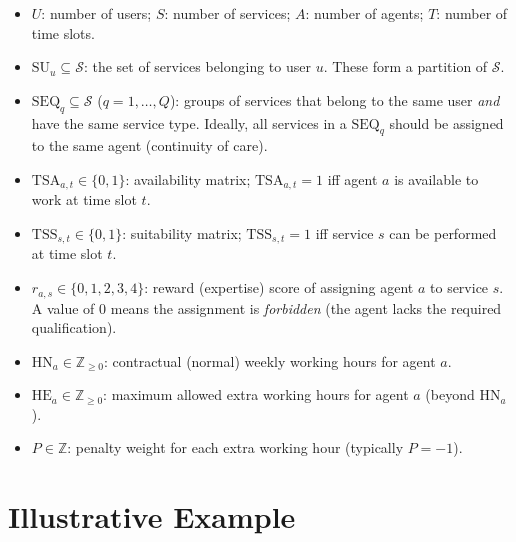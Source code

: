 \documentclass[11pt,a4paper]{article}
\newcommand{\setS}{\mathcal{S}}
\newcommand{\SU}{\mathrm{SU}}
\newcommand{\SEQ}{\mathrm{SEQ}}
\newcommand{\TSA}{\mathrm{TSA}}
\newcommand{\TSS}{\mathrm{TSS}}
\newcommand{\HN}{\mathrm{HN}}
\newcommand{\HE}{\mathrm{HE}}
\begin{document}
\begin{itemize}
    \item $U$: number of users; \;
          $S$: number of services; \;
          $A$: number of agents; \;
          $T$: number of time slots.
    \item $\SU_u \subseteq \setS$: the set of services belonging to user $u$.
          These form a partition of $\setS$.
    \item $\SEQ_q \subseteq \setS$ ($q = 1,\ldots,Q$): groups of services that
          belong to the same user \emph{and} have the same service type.
          Ideally, all services in a $\SEQ_q$ should be assigned to the same agent
          (continuity of care).
    \item $\TSA_{a,t} \in \{0,1\}$: availability matrix;
          $\TSA_{a,t} = 1$ iff agent $a$ is available to work at time slot $t$.
    \item $\TSS_{s,t} \in \{0,1\}$: suitability matrix;
          $\TSS_{s,t} = 1$ iff service $s$ can be performed at time slot $t$.
    \item $r_{a,s} \in \{0,1,2,3,4\}$: reward (expertise) score of assigning agent
          $a$ to service $s$.  A value of $0$ means the assignment is
          \emph{forbidden} (the agent lacks the required qualification).
    \item $\HN_a \in \mathbb{Z}_{\ge 0}$: contractual (normal) weekly working
          hours for agent $a$.
    \item $\HE_a \in \mathbb{Z}_{\ge 0}$: maximum allowed extra working hours
          for agent $a$ (beyond $\HN_a$).
    \item $P \in \mathbb{Z}$: penalty weight for each extra working hour
          (typically $P = -1$).
\end{itemize}


\section{Illustrative Example}\label{sec:example}
\end{document}
